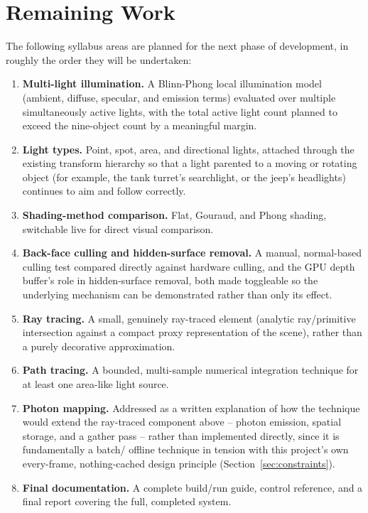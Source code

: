 \documentclass[11pt,a4paper]{article}
\begin{document}
\section{Remaining Work}
\label{sec:future-work}

The following syllabus areas are planned for the next phase of
development, in roughly the order they will be undertaken:

\begin{enumerate}[nosep]
  \item \textbf{Multi-light illumination.} A Blinn-Phong local
        illumination model (ambient, diffuse, specular, and emission
        terms) evaluated over multiple simultaneously active lights,
        with the total active light count planned to exceed the
        nine-object count by a meaningful margin.
  \item \textbf{Light types.} Point, spot, area, and directional lights,
        attached through the existing transform hierarchy so that a
        light parented to a moving or rotating object (for example, the
        tank turret's searchlight, or the jeep's headlights) continues
        to aim and follow correctly.
  \item \textbf{Shading-method comparison.} Flat, Gouraud, and Phong
        shading, switchable live for direct visual comparison.
  \item \textbf{Back-face culling and hidden-surface removal.} A manual,
        normal-based culling test compared directly against hardware
        culling, and the GPU depth buffer's role in hidden-surface
        removal, both made toggleable so the underlying mechanism can be
        demonstrated rather than only its effect.
  \item \textbf{Ray tracing.} A small, genuinely ray-traced element
        (analytic ray/primitive intersection against a compact proxy
        representation of the scene), rather than a purely decorative
        approximation.
  \item \textbf{Path tracing.} A bounded, multi-sample numerical
        integration technique for at least one area-like light source.
  \item \textbf{Photon mapping.} Addressed as a written explanation of
        how the technique would extend the ray-traced component above --
        photon emission, spatial storage, and a gather pass -- rather
        than implemented directly, since it is fundamentally a batch/
        offline technique in tension with this project's own
        every-frame, nothing-cached design principle
        (Section~\ref{sec:constraints}).
  \item \textbf{Final documentation.} A complete build/run guide,
        control reference, and a final report covering the full,
        completed system.
\end{enumerate}
\end{document}
